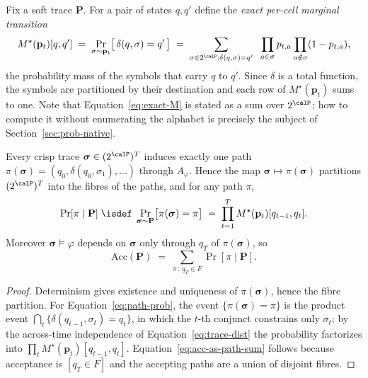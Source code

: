 Fix a soft trace $\mathbf{P}$. For a pair of states $q, q'$ define the \emph{exact per-cell marginal transition}
\begin{equation}
  M^\star(\mathbf{p}_t)[q, q']
  \;=\;
  \Pr_{\sigma \sim \mathbf{p}_t}\bigl[\, \delta(q, \sigma) = q' \,\bigr]
  \;=\;
  \sum_{\sigma \in 2^\calP : \delta(q,\sigma) = q'} \;\; \prod_{a \in \sigma} p_{t,a} \prod_{a \notin \sigma} (1 - p_{t,a}),
  \label{eq:exact-M}
\end{equation}
the probability mass of the symbols that carry $q$ to $q'$. Since $\delta$ is a total function, the symbols are partitioned by their destination and each row of $M^\star(\mathbf{p}_t)$ sums to one. Note that Equation~\eqref{eq:exact-M} is stated as a sum over $2^\calP$; how to compute it without enumerating the alphabet is precisely the subject of Section~\ref{sec:prob-native}.

\begin{lemma}
\label{lem:run-partition}
Every crisp trace $\boldsymbol{\sigma} \in (2^\calP)^T$ induces exactly one path $\pi(\boldsymbol{\sigma}) = (q_0, \delta(q_0,\sigma_1), \dots)$ through $A_\varphi$. Hence the map $\boldsymbol{\sigma} \mapsto \pi(\boldsymbol{\sigma})$ partitions $(2^\calP)^T$ into the fibres of the paths, and for any path $\pi$,
\begin{equation}
  \Pr[\pi \mid \mathbf{P}]
  \;\isdef\;
  \Pr_{\boldsymbol{\sigma} \sim \mathbf{P}}\bigl[\pi(\boldsymbol{\sigma}) = \pi\bigr]
  \;=\;
  \prod_{t=1}^{T} M^\star(\mathbf{p}_t)[q_{t-1}, q_t].
  \label{eq:path-prob}
\end{equation}
Moreover $\boldsymbol{\sigma} \models \varphi$ depends on $\boldsymbol{\sigma}$ only through $q_T$ of $\pi(\boldsymbol{\sigma})$, so
\begin{equation}
  \mathrm{Acc}(\mathbf{P}) \;=\; \sum_{\pi \,:\, q_T \in F} \Pr[\pi \mid \mathbf{P}].
  \label{eq:acc-as-path-sum}
\end{equation}
\end{lemma}

\begin{proof}
Determinism gives existence and uniqueness of $\pi(\boldsymbol{\sigma})$, hence the fibre partition. For Equation~\eqref{eq:path-prob}, the event $\{\pi(\boldsymbol{\sigma}) = \pi\}$ is the product event $\bigcap_t \{\delta(q_{t-1}, \sigma_t) = q_t\}$, in which the $t$-th conjunct constrains only $\sigma_t$; by the across-time independence of Equation~\eqref{eq:trace-dist} the probability factorizes into $\prod_t M^\star(\mathbf{p}_t)[q_{t-1}, q_t]$. Equation~\eqref{eq:acc-as-path-sum} follows because acceptance is $[q_T \in F]$ and the accepting paths are a union of disjoint fibres.
\end{proof}

